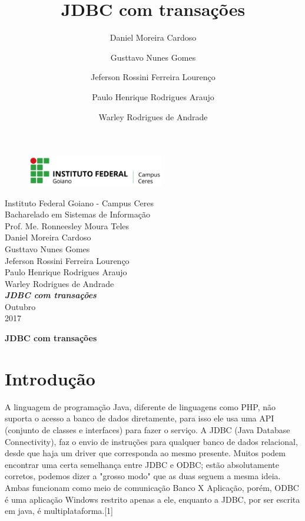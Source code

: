 \documentclass[12pt,a4paper]{article}
\title{JDBC com transações}
\author{Daniel Moreira Cardoso \and Gusttavo Nunes Gomes\and Jeferson Rossini Ferreira Lourenço\and Paulo Henrique Rodrigues Araujo\and Warley Rodrigues de Andrade}
\begin{document}
\begin{titlepage}
\begin{center}
\begin{figure}[htb]
                
                \label{figura:LogoIF}
        
                \centering
                \includegraphics[width=6cm]{recursos/imagens/logo.png} 
\end{figure}
Instituto Federal Goiano - Campus Ceres\\
Bacharelado em Sistemas de Informação\\
Prof. Me. Ronneesley Moura Teles\\\vspace{0.5cm}
Daniel Moreira Cardoso \\
Gusttavo Nunes Gomes\\
Jeferson Rossini Ferreira Lourenço\\
Paulo Henrique Rodrigues Araujo\\
Warley Rodrigues de Andrade\\
\vspace{5.0cm}
\textit{\textbf{\Large{JDBC com transações}}}\\\vspace{0.5cm}
\vspace{9.5cm}
Outubro\\
2017\\
\end{center}
\end{titlepage}
\tableofcontents
\newpage
\begin{center}
\textbf{\Large{JDBC com transações}}\\\vspace{0.5cm}
\end{center}
\section{Introdução}
A linguagem de programação Java, diferente de linguagens como PHP, não suporta o acesso a banco de dados diretamente, para isso ele usa uma API (conjunto de classes e interfaces) para fazer o serviço. A JDBC (Java Database Connectivity), faz o envio de instruções para qualquer banco de dados relacional, desde que haja um driver que corresponda ao mesmo presente. 
Muitos podem encontrar uma certa semelhança entre JDBC e ODBC; estão absolutamente corretos, podemos dizer a "grosso modo" que as duas seguem a mesma ideia. Ambas funcionam como meio de comunicação Banco X Aplicação, porém, ODBC é uma aplicação Windows restrito apenas a ele, enquanto a JDBC, por ser escrita em java, é multiplataforma.[1]
\end{document}
